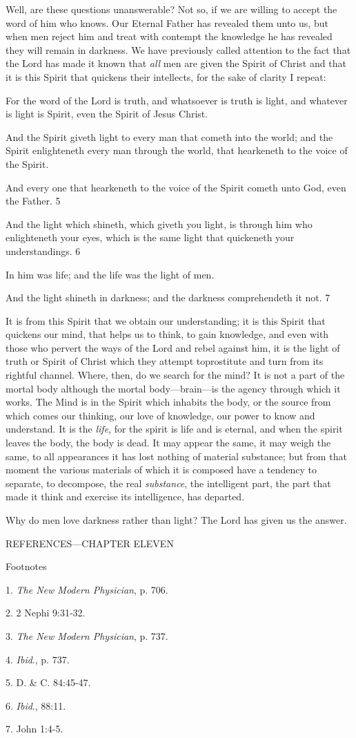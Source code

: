 Well, are these questions unanswerable? Not so, if we are willing to accept the word of him
who knows. Our Eternal Father has revealed them unto us, but when men reject him and treat
with contempt the knowledge he has revealed they will remain in darkness. We have
previously called attention to the fact that the Lord has made it known that \textit{all} men are given
the Spirit of Christ and that it is this Spirit that quickens their intellects, for the sake of clarity
I repeat:

For the word of the Lord is truth, and whatsoever is truth is light, and whatever is light is
Spirit, even the Spirit of Jesus Christ.

And the Spirit giveth light to every man that cometh into the world; and the Spirit
enlighteneth every man through the world, that hearkeneth to the voice of the Spirit.

And every one that hearkeneth to the voice of the Spirit cometh unto God, even the Father. 5

And the light which shineth, which giveth you light, is through him who enlighteneth your
eyes, which is the same light that quickeneth your understandings. 6

In him was life; and the life was the light of men.

And the light shineth in darkness; and the darkness comprehendeth it not. 7

It is from this Spirit that we obtain our understanding; it is this Spirit that quickens our mind,
that helps us to think, to gain knowledge, and even with those who pervert the ways of the
Lord and rebel against him, it is the light of truth or Spirit of Christ which they attempt toprostitute and turn from its rightful channel. Where, then, do we search for the mind? It is not
a part of the mortal body although the mortal body—brain—is the agency through which it
works. The Mind is in the Spirit which inhabits the body, or the source from which comes
our thinking, our love of knowledge, our power to know and understand. It is the \textit{life}, for the
spirit is life and is eternal, and when the spirit leaves the body, the body is dead. It may
appear the same, it may weigh the same, to all appearances it has lost nothing of material
substance; but from that moment the various materials of which it is composed have a
tendency to separate, to decompose, the real \textit{substance}, the intelligent part, the part that made
it think and exercise its intelligence, has departed.

Why do men love darkness rather than light? The Lord has given us the answer.

\newpage
REFERENCES—CHAPTER ELEVEN

Footnotes

1. \textit{The New Modern Physician}, p. 706.

2. 2 Nephi 9:31-32.

3. \textit{The New Modern Physician}, p. 737.

4. \textit{Ibid}., p. 737.

5. D. \& C. 84:45-47.

6. \textit{Ibid}., 88:11.

7. John 1:4-5.

